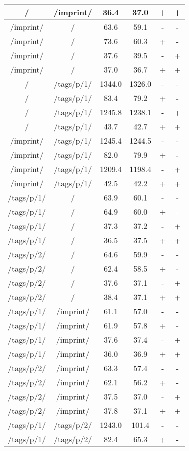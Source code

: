 \begin{appendix}
\begin{center}
\begin{longtable}{cccccc}
/ & /imprint/ & 36.4 & 37.0 & + & + \\
\hline
/imprint/ & / & 63.6 & 59.1 & - & - \\
/imprint/ & / & 73.6 & 60.3 & + & - \\
/imprint/ & / & 37.6 & 39.5 & - & + \\
/imprint/ & / & 37.0 & 36.7 & + & + \\
\hline
\hline
/ & /tags/p/1/ & 1344.0 & 1326.0 & - & - \\
/ & /tags/p/1/ & 83.4 & 79.2 & + & - \\
/ & /tags/p/1/ & 1245.8 & 1238.1 & - & + \\
/ & /tags/p/1/ & 43.7 & 42.7 & + & + \\
\hline
/imprint/ & /tags/p/1/ & 1245.4 & 1244.5 & - & - \\
/imprint/ & /tags/p/1/ & 82.0 & 79.9 & + & - \\
/imprint/ & /tags/p/1/ & 1209.4 & 1198.4 & - & + \\
/imprint/ & /tags/p/1/ & 42.5 & 42.2 & + & + \\
\hline
\hline
/tags/p/1/ & / & 63.9 & 60.1 & - & - \\
/tags/p/1/ & / & 64.9 & 60.0 & + & - \\
/tags/p/1/ & / & 37.3 & 37.2 & - & + \\
/tags/p/1/ & / & 36.5 & 37.5 & + & + \\
\hline
/tags/p/2/ & / & 64.6 & 59.9 & - & - \\
/tags/p/2/ & / & 62.4 & 58.5 & + & - \\
/tags/p/2/ & / & 37.6 & 37.1 & - & + \\
/tags/p/2/ & / & 38.4 & 37.1 & + & + \\
\hline
/tags/p/1/ & /imprint/ & 61.1 & 57.0 & - & - \\
/tags/p/1/ & /imprint/ & 61.9 & 57.8 & + & - \\
/tags/p/1/ & /imprint/ & 37.6 & 37.4 & - & + \\
/tags/p/1/ & /imprint/ & 36.0 & 36.9 & + & + \\
\hline
/tags/p/2/ & /imprint/ & 63.3 & 57.4 & - & - \\
/tags/p/2/ & /imprint/ & 62.1 & 56.2 & + & - \\
/tags/p/2/ & /imprint/ & 37.5 & 37.0 & - & + \\
/tags/p/2/ & /imprint/ & 37.8 & 37.1 & + & + \\
\hline
\hline
/tags/p/1/ & /tags/p/2/ & 1243.0 & 101.4 & - & - \\
/tags/p/1/ & /tags/p/2/ & 82.4 & 65.3 & + & - \\

\end{longtable}
\end{center}
\end{appendix}
